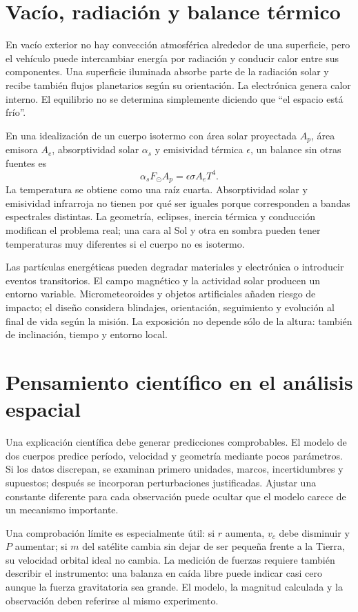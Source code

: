 \section{Vacío, radiación y balance térmico}
En vacío exterior no hay convección atmosférica alrededor de una superficie, pero el vehículo puede intercambiar energía por radiación y conducir calor entre sus componentes. Una superficie iluminada absorbe parte de la radiación solar y recibe también flujos planetarios según su orientación. La electrónica genera calor interno. El equilibrio no se determina simplemente diciendo que ``el espacio está frío''.

En una idealización de un cuerpo isotermo con área solar proyectada $A_p$, área emisora $A_e$, absorptividad solar $\alpha_s$ y emisividad térmica $\epsilon$, un balance sin otras fuentes es
\begin{equation}
\alpha_s F_\odot A_p=\epsilon\sigma A_eT^4.
\end{equation}
La temperatura se obtiene como una raíz cuarta. Absorptividad solar y emisividad infrarroja no tienen por qué ser iguales porque corresponden a bandas espectrales distintas. La geometría, eclipses, inercia térmica y conducción modifican el problema real; una cara al Sol y otra en sombra pueden tener temperaturas muy diferentes si el cuerpo no es isotermo.

Las partículas energéticas pueden degradar materiales y electrónica o introducir eventos transitorios. El campo magnético y la actividad solar producen un entorno variable. Micrometeoroides y objetos artificiales añaden riesgo de impacto; el diseño considera blindajes, orientación, seguimiento y evolución al final de vida según la misión. La exposición no depende sólo de la altura: también de inclinación, tiempo y entorno local.

\section{Pensamiento científico en el análisis espacial}
Una explicación científica debe generar predicciones comprobables. El modelo de dos cuerpos predice período, velocidad y geometría mediante pocos parámetros. Si los datos discrepan, se examinan primero unidades, marcos, incertidumbres y supuestos; después se incorporan perturbaciones justificadas. Ajustar una constante diferente para cada observación puede ocultar que el modelo carece de un mecanismo importante.

Una comprobación límite es especialmente útil: si $r$ aumenta, $v_c$ debe disminuir y $P$ aumentar; si $m$ del satélite cambia sin dejar de ser pequeña frente a la Tierra, su velocidad orbital ideal no cambia. La medición de fuerzas requiere también describir el instrumento: una balanza en caída libre puede indicar casi cero aunque la fuerza gravitatoria sea grande. El modelo, la magnitud calculada y la observación deben referirse al mismo experimento.

